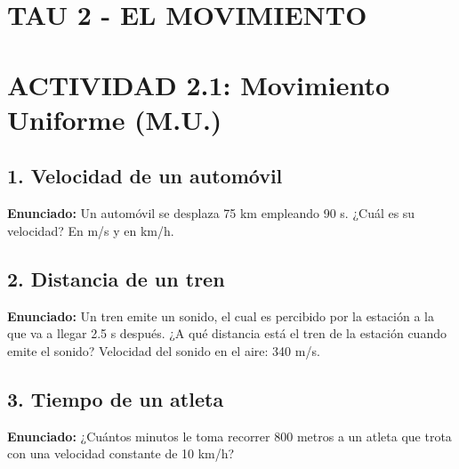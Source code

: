 \documentclass[12pt, letterpaper]{article}
\begin{document}
\section*{TAU 2 - EL MOVIMIENTO}

\section*{ACTIVIDAD 2.1: Movimiento Uniforme (M.U.)}

\subsection*{1. Velocidad de un automóvil}
\noindent \textbf{Enunciado:} Un automóvil se desplaza 75 km empleando 90 s. ¿Cuál es su velocidad? En m/s y en km/h.


\subsection*{2. Distancia de un tren}
\noindent \textbf{Enunciado:} Un tren emite un sonido, el cual es percibido por la estación a la que va a llegar 2.5 s después. ¿A qué distancia está el tren de la estación cuando emite el sonido? Velocidad del sonido en el aire: 340 m/s.


\subsection*{3. Tiempo de un atleta}
\noindent \textbf{Enunciado:} ¿Cuántos minutos le toma recorrer 800 metros a un atleta que trota con una velocidad constante de 10 km/h?
\end{document}
